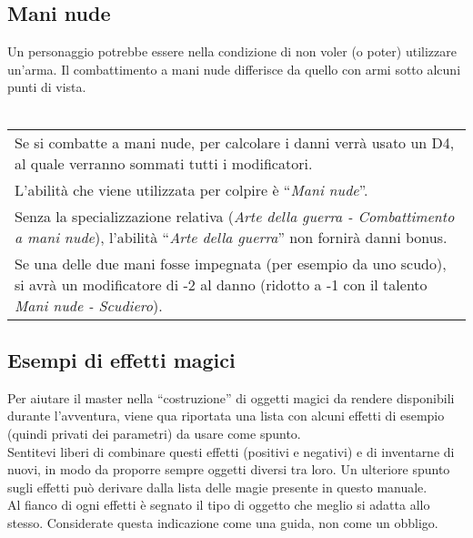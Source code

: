 \documentclass[../manuale_main.tex]{subfiles}
\begin{document}
\subsection{Mani nude}

Un personaggio potrebbe essere nella condizione di non voler (o poter) utilizzare un'arma. Il combattimento a mani nude differisce da quello con armi sotto alcuni punti di vista.\\\mbox{}\\
\renewcommand{\arraystretch}{1.5}
\begin{tabularx}{\linewidth}{|X|}
\hline
Se si combatte a mani nude, per calcolare i danni verrà usato un D4, al quale verranno sommati tutti i modificatori.\\
L'abilità che viene utilizzata per colpire è “\emph{Mani nude}”.\\
Senza la specializzazione relativa (\emph{Arte della guerra - Combattimento a mani nude}), l'abilità “\emph{Arte della guerra}” non fornirà danni bonus.\\
Se una delle due mani fosse impegnata (per esempio da uno scudo), si avrà un modificatore di -2 al danno (ridotto a -1 con il talento \emph{Mani nude - Scudiero}).\\
\hline
\end{tabularx}


\subsection{Esempi di effetti magici}

Per aiutare il master nella “costruzione” di oggetti magici da rendere disponibili durante l’avventura, viene qua riportata una lista con alcuni effetti di esempio (quindi privati dei parametri) da usare come spunto.\\
Sentitevi liberi di combinare questi effetti (positivi e negativi) e di inventarne di nuovi, in modo da proporre sempre oggetti diversi tra loro. Un ulteriore spunto sugli effetti può derivare dalla lista delle magie presente in questo manuale.\\
Al fianco di ogni effetti è segnato il tipo di oggetto che meglio si adatta allo stesso. Considerate questa indicazione come una guida, non come un obbligo.
\end{document}
